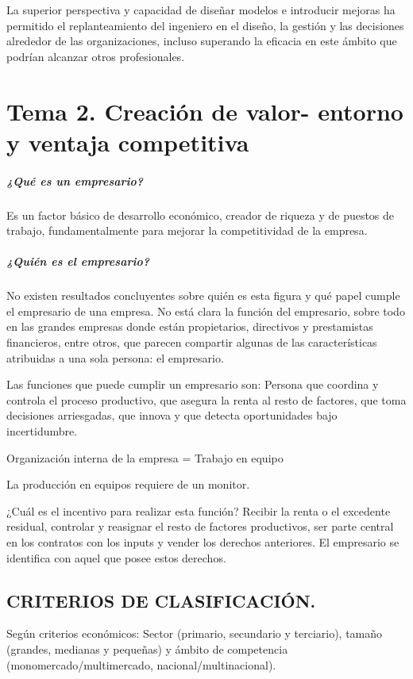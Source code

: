 \documentclass[12pt, twoside, openright]{report} %
\begin{document}
La superior perspectiva y capacidad de diseñar modelos e introducir mejoras ha permitido el replanteamiento
del ingeniero en el diseño, la gestión y las decisiones alrededor de las organizaciones, incluso superando la
eficacia en este ámbito que podrían alcanzar otros profesionales.



\chapter{Tema 2. Creación de valor- entorno y ventaja competitiva}
\paragraph{¿Qué es un empresario?} Es un factor básico de desarrollo económico, creador de riqueza y de puestos de
trabajo, fundamentalmente para mejorar la competitividad de la empresa.

\paragraph{¿Quién es el empresario?} No existen resultados concluyentes sobre quién es esta figura y qué papel cumple
el empresario de una empresa. No está clara la función del empresario, sobre todo en las grandes empresas
donde están propietarios, directivos y prestamistas financieros, entre otros, que parecen compartir algunas
de las características atribuidas a una sola persona: el empresario.

Las funciones que puede cumplir un empresario son: Persona que coordina y controla el proceso productivo,
que asegura la renta al resto de factores, que toma decisiones arriesgadas, que innova y que detecta
oportunidades bajo incertidumbre.

Organización interna de la empresa = Trabajo en equipo

La producción en equipos requiere de un monitor.

¿Cuál es el incentivo para realizar esta función? Recibir la renta o el excedente residual, controlar y reasignar
el resto de factores productivos, ser parte central en los contratos con los inputs y vender los derechos
anteriores. El empresario se identifica con aquel que posee estos derechos.

\section{CRITERIOS DE CLASIFICACIÓN.}
Según criterios económicos: Sector (primario, secundario y terciario), tamaño (grandes, medianas y
pequeñas) y ámbito de competencia (monomercado/multimercado, nacional/multinacional).
\end{document}

